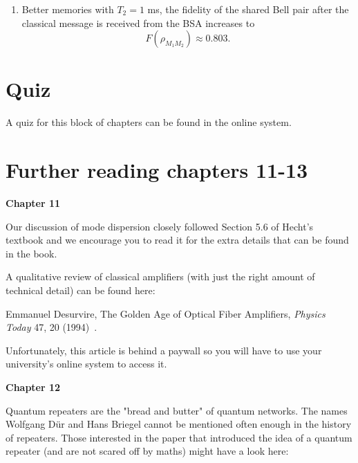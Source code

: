\begin{solution}
\begin{enumerate}[label=(\alph*)]
\begin{equation*}
        F(\rho_{M_1M_2}) = F(2t_{\text{mem}\rightarrow\text{BSA}})^2 + (1-F(2t_{\text{mem}\rightarrow\text{BSA}}))^2 \approx 0.503.
    \end{equation*}
    \item Better memories with $T_2=1$ ms, the fidelity of the shared Bell pair after the classical message is received from the BSA increases to
    \begin{equation*}
        F(\rho_{M_1M_2}) \approx 0.803.
    \end{equation*}
\end{enumerate}
\end{solution}


\newpage
\section*{Quiz}
A quiz for this block of chapters can be found in the online system.


\section*{Further reading chapters 11-13}

{\bf Chapter 11}

Our discussion of mode dispersion closely followed Section 5.6 of Hecht’s textbook and we encourage you to read it for the extra details that can be found in the book.

A qualitative review of classical amplifiers (with just the right amount of technical detail) can be found here:

Emmanuel Desurvire, The Golden Age of Optical Fiber Amplifiers, \emph{Physics Today} 47, 20 (1994)~\cite{desurvire1994golden}.

Unfortunately, this article is behind a paywall so you will have to use your university’s online system to access it.

{\bf Chapter 12}

Quantum repeaters are the "bread and butter" of quantum networks. The names Wolfgang D\"ur and Hans Briegel cannot be mentioned often enough in the history of repeaters. Those interested in the paper that introduced the idea of a quantum repeater (and are not scared off by maths) might have a look here:

